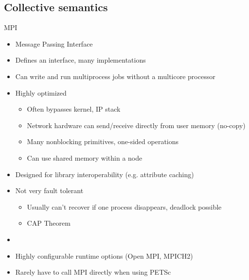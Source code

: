 \subsection{Collective semantics}
\begin{frame}{MPI}
  \begin{itemize}
  \item Message Passing Interface
  \item Defines an interface, many implementations
  \item Can write and run multiprocess jobs without a multicore processor
  \item Highly optimized
    \begin{itemize}
    \item Often bypasses kernel, IP stack
    \item Network hardware can send/receive directly from user memory (no-copy)
    \item Many nonblocking primitives, one-sided operations
    \item Can use shared memory within a node
    \end{itemize}
  \item Designed for library interoperability (e.g. attribute caching)
  \item Not very fault tolerant
    \begin{itemize}
    \item Usually can't recover if one process disappears, deadlock possible
    \item CAP Theorem
    \end{itemize}
  \item {}
  \item Highly configurable runtime options (Open MPI, MPICH2)
  \item Rarely have to call MPI directly when using PETSc
  \end{itemize}
\end{frame}

